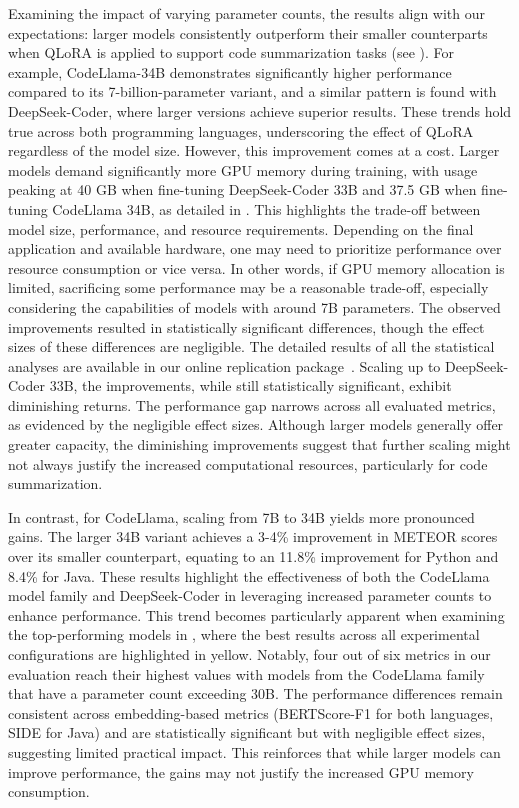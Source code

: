 Examining the impact of varying parameter counts, the results align with our expectations: larger models consistently outperform their smaller counterparts when QLoRA is applied to support code summarization tasks (see ). For example, CodeLlama-34B demonstrates significantly higher performance compared to its 7-billion-parameter variant, and a similar pattern is found with DeepSeek-Coder, where larger versions achieve superior results. These trends hold true across both programming languages, underscoring the effect of QLoRA regardless of the model size.
However, this improvement comes at a cost. Larger models demand significantly more GPU memory during training, with usage peaking at 40 GB when fine-tuning DeepSeek-Coder 33B and 37.5 GB when fine-tuning CodeLlama 34B, as detailed in .
This highlights the trade-off between model size, performance, and resource requirements. Depending on the final application and available hardware, one may need to prioritize performance over resource consumption or vice versa.
In other words, if GPU memory allocation is limited, sacrificing some performance may be a reasonable trade-off, especially considering the capabilities of models with around 7B parameters.
The observed improvements resulted in statistically significant differences, though the effect sizes of these differences are negligible. 
The detailed results of all the statistical analyses are available in our online replication package~\cite{replication}.
Scaling up to DeepSeek-Coder 33B, the improvements, while still statistically significant, exhibit diminishing returns. The performance gap narrows across all evaluated metrics, as evidenced by the negligible effect sizes. Although larger models generally offer greater capacity, the diminishing improvements suggest that further scaling might not always justify the increased computational resources, particularly for code summarization.

In contrast, for CodeLlama, scaling from 7B to 34B yields more pronounced gains. The larger 34B variant achieves a 3-4\% improvement in METEOR scores over its smaller counterpart, equating to an 11.8\% improvement for Python and  8.4\% for Java. These results highlight the effectiveness of both the CodeLlama model family and DeepSeek-Coder in leveraging increased parameter counts to enhance performance. This trend becomes particularly apparent when examining the top-performing models in , where the best results across all experimental configurations are highlighted in yellow. Notably, four out of six metrics in our evaluation reach their highest values with models from the CodeLlama family that have a parameter count exceeding 30B.
The performance differences remain consistent across embedding-based metrics (BERTScore-F1 for both languages, SIDE for Java) and are statistically significant but with negligible effect sizes, suggesting limited practical impact. This reinforces that while larger models can improve performance, the gains may not justify the increased GPU memory consumption.



